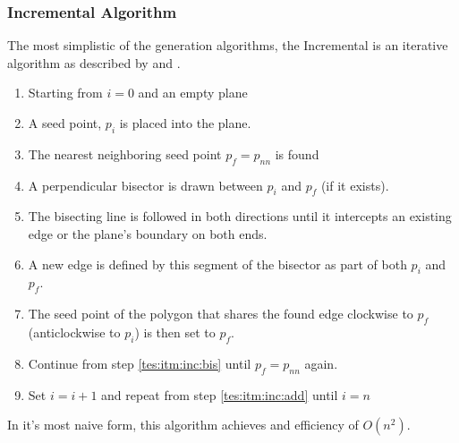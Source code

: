 \subsubsection{Incremental Algorithm}\label{tes:ssec:inc}
The most simplistic of the generation algorithms, the Incremental is an iterative algorithm as described by \cite{green1978computing} and \cite{okabe2009spatial}.
\begin{enumerate}
\item Starting from $i=0$ and an empty plane
\item\label{tes:itm:inc:add} A seed point, $p_i$ is placed into the plane.
\item The nearest neighboring seed point $p_f=p_{nn}$ is found
\item\label{tes:itm:inc:bis} A perpendicular bisector is drawn between $p_i$ and $p_f$ (if it exists).
\item The bisecting line is followed in both directions until it intercepts an existing edge or the plane's boundary on both ends.
\item A new edge is defined by this segment of the bisector as part of both $p_i$ and $p_f$.
\item The seed point of the polygon that shares the found edge clockwise to $p_f$ (anticlockwise to $p_i$) is then set to $p_f$.
\item Continue from step \ref{tes:itm:inc:bis} until $p_f=p_{nn}$ again.
\item Set $i = i +1$ and repeat from step \ref{tes:itm:inc:add} until $i=n$
\end{enumerate}
In it's most naive form, this algorithm achieves and efficiency of $O(n^2)$.
%

